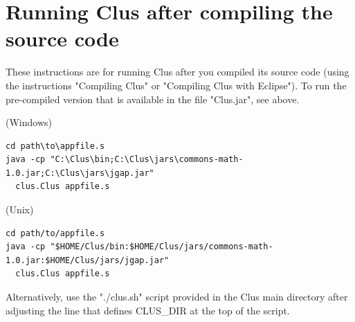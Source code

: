 \documentclass[a4paper]{report}
\begin{document}
\section{Running Clus after compiling the source code}

These instructions are for running Clus after you compiled its source code (using the instructions "Compiling Clus" or "Compiling Clus with Eclipse"). To run the pre-compiled version that is available in the file "Clus.jar", see above.

(Windows)
\begin{small}
\begin{verbatim}
cd path\to\appfile.s
java -cp "C:\Clus\bin;C:\Clus\jars\commons-math-1.0.jar;C:\Clus\jars\jgap.jar" 
  clus.Clus appfile.s
\end{verbatim}
\end{small}

(Unix)

\begin{small}
\begin{verbatim}
cd path/to/appfile.s
java -cp "$HOME/Clus/bin:$HOME/Clus/jars/commons-math-1.0.jar:$HOME/Clus/jars/jgap.jar" 
  clus.Clus appfile.s
\end{verbatim}
\end{small}

Alternatively, use the "./clus.sh" script provided in the Clus main directory after adjusting the line that defines CLUS\_DIR at the top of the script.



\end{document}
